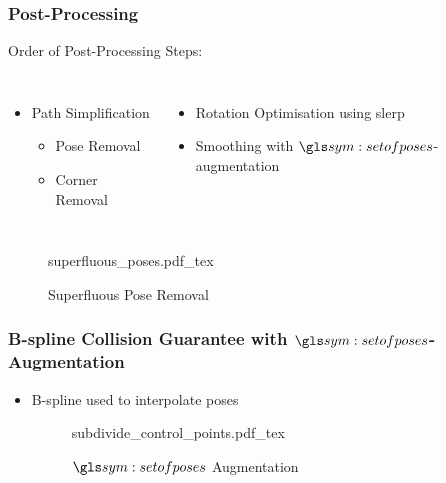 \begin{frame}
	\frametitle{Post-Processing}

	Order of Post-Processing Steps:

	\begin{columns}

			\begin{itemize}

				\item
					Path Simplification
					\begin{itemize}
						\item Pose Removal
						\item Corner Removal
					\end{itemize}
			\end{itemize}


			\begin{itemize}
				\item Rotation Optimisation using slerp
				\item Smoothing with $\setofposes$-augmentation

			\end{itemize}


	\end{columns}
		\begin{figure}[hb]
			\centering
			\def\svgwidth{\columnwidth}
			{superfluous_poses.pdf_tex}
			\caption{Superfluous Pose Removal}%
			\label{fig:superfluous_poses}
		\end{figure}

\end{frame}

\begin{frame}
	\frametitle{B-spline Collision Guarantee with $\setofposes$-Augmentation}

	\begin{itemize}
		\item B-spline used to interpolate poses
		\begin{figure}[hbt]
			\centering
			\def\svgwidth{0.7\columnwidth}
			{subdivide_control_points.pdf_tex}
			\caption{$\setofposes$ Augmentation}%
			\label{fig:set_of_poses_augmentation}
		\end{figure}
	\end{itemize}
\end{frame}

